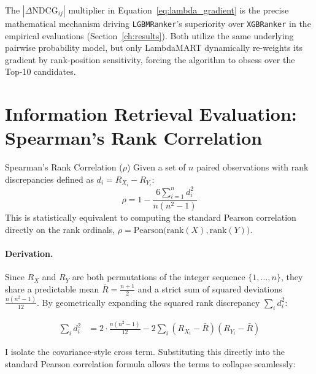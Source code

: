 \begin{insightbox}
The $|\Delta\text{NDCG}_{ij}|$ multiplier in Equation~\eqref{eq:lambda_gradient} is the precise mathematical mechanism driving \texttt{LGBMRanker}'s superiority over \texttt{XGBRanker} in the empirical evaluations (Section~\ref{ch:results}). Both utilize the same underlying pairwise probability model, but only LambdaMART dynamically re-weights its gradient by rank-position sensitivity, forcing the algorithm to obsess over the Top-10 candidates.
\end{insightbox}

\section{Information Retrieval Evaluation: Spearman's Rank Correlation}
\label{sec:spearman_theory}

\begin{definitionbox}{Spearman's Rank Correlation ($\rho$)}
Given a set of $n$ paired observations with rank discrepancies defined as $d_i = R_{X_i} - R_{Y_i}$:
\begin{equation}
\rho = 1 - \frac{6\sum_{i=1}^{n} d_i^2}{n(n^2-1)}
\label{eq:spearman}
\end{equation}
This is statistically equivalent to computing the standard Pearson correlation directly on the rank ordinals, $\rho = \text{Pearson}\big(\text{rank}(X), \text{rank}(Y)\big)$.
\end{definitionbox}

\vspace{0.5em}

\paragraph{Derivation.} Since $R_X$ and $R_Y$ are both permutations of the integer sequence $\{1,\ldots,n\}$, they share a predictable mean $\bar{R} = \frac{n+1}{2}$ and a strict sum of squared deviations $\frac{n(n^2-1)}{12}$. By geometrically expanding the squared rank discrepancy $\sum_i d_i^2$:

\begin{align}
\sum_i d_i^2 &= 2\cdot\frac{n(n^2-1)}{12} - 2\sum_i (R_{X_i}-\bar R)(R_{Y_i}-\bar R)
\label{eq:spearman_exp}
\end{align}

\vspace{0.5em}

I isolate the covariance-style cross term. Substituting this directly into the standard Pearson correlation formula allows the terms to collapse seamlessly:

